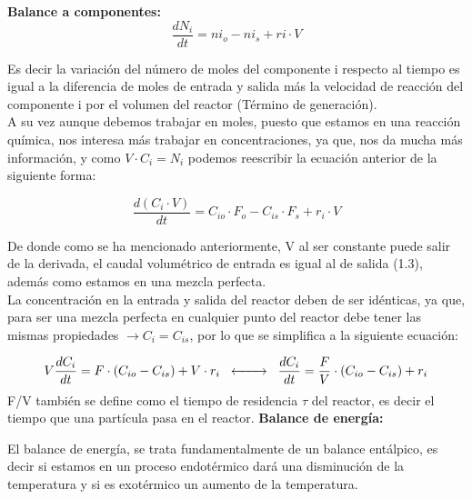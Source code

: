 \vspace{1\baselineskip}
\noindent \textbf{Balance a componentes:}
\begin{equation}
  \frac{dN_i}{dt}=ni_o-ni_s +ri \cdot V
\end{equation}
\begin{flushleft}
  \noindent Es decir la variación del número de moles del componente i respecto al tiempo es igual a la diferencia de moles de entrada y salida más la velocidad de reacción del componente i por el volumen del reactor (Término de generación).\\

  A su vez aunque debemos trabajar en moles, puesto que estamos en una reacción química, nos interesa más trabajar en concentraciones, ya que, nos da mucha más información, y como
  $V\cdot C_i =N_i$ podemos reescribir la ecuación anterior de la siguiente forma:

\end{flushleft}
\begin{equation}
  \frac{d(C_i\cdot V)}{dt}=C_{io}\cdot F_o-C_{is}\cdot F_s +r_i \cdot V
\end{equation}
\begin{flushleft}

  \noindent De donde como se ha mencionado anteriormente, V al ser constante puede salir de la derivada, el caudal volumétrico de entrada es igual al de salida (1.3), además como estamos en una mezcla perfecta.\\
  La concentración en la entrada y salida del reactor deben de ser idénticas, ya que, para ser una mezcla perfecta en cualquier punto del reactor debe tener las mismas propiedades $\rightarrow C_i=C_{is}$, por lo que se simplifica a la siguiente ecuación:

\end{flushleft}
\begin{equation}
  V\frac{dC_i}{dt}=F\cdot (C_{io}-C_{is}) +V \cdot r_i \hspace{0.2cm}\xleftrightarrow{\;\qquad} \hspace{0.2cm}\frac{dC_i}{dt}=\frac{F}{V}\cdot (C_{io}-C_{is}) +r_i
\end{equation}
\noindent F/V también se define como el tiempo de residencia $\tau$ del reactor, es decir el tiempo que una partícula pasa en el reactor.
\newpage
\vspace{1\baselineskip}
\noindent \textbf{Balance de energía:}
\begin{flushleft}
  \noindent El balance de energía, se trata fundamentalmente de un balance entálpico, es decir si estamos en un proceso endotérmico dará una disminución de la temperatura y si es exotérmico un aumento de la temperatura.\\
\end{flushleft}

